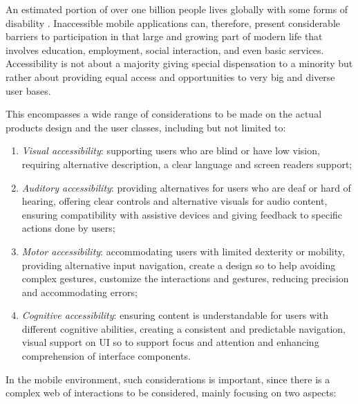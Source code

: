 An estimated portion of over one billion people lives globally with some forms of disability \cite{article:who-disability}. Inaccessible mobile applications can, therefore, present considerable barriers to participation in that large and growing part of modern life that involves education, employment, social interaction, and even basic services. Accessibility is not about a majority giving special dispensation to a minority but rather about providing equal access and opportunities to very big and diverse user bases.

This encompasses a wide range of considerations to be made on the actual products design and the user classes, including but not limited to:
\begin{enumerate}
    \item \textit{Visual accessibility}: supporting users who are blind or have low vision, requiring alternative description, a clear language and screen readers support;

    \item \textit{Auditory accessibility}: providing alternatives for users who are deaf or hard of hearing, offering clear controls and alternative  visuals for audio content, ensuring compatibility with assistive devices and giving feedback to specific actions done by users;

    \item \textit{Motor accessibility}: accommodating users with limited dexterity or mobility, providing alternative input navigation, create a design so to help avoiding complex gestures, customize the interactions and gestures, reducing precision and accommodating errors;

    \item \textit{Cognitive accessibility}: ensuring content is understandable for users with different cognitive abilities, creating a consistent and predictable navigation, visual support on UI so to support focus and attention and enhancing comprehension of interface components.
    
\end{enumerate}

In the mobile environment, such considerations is important, since there is a complex web of interactions to be considered, mainly focusing on two aspects:

